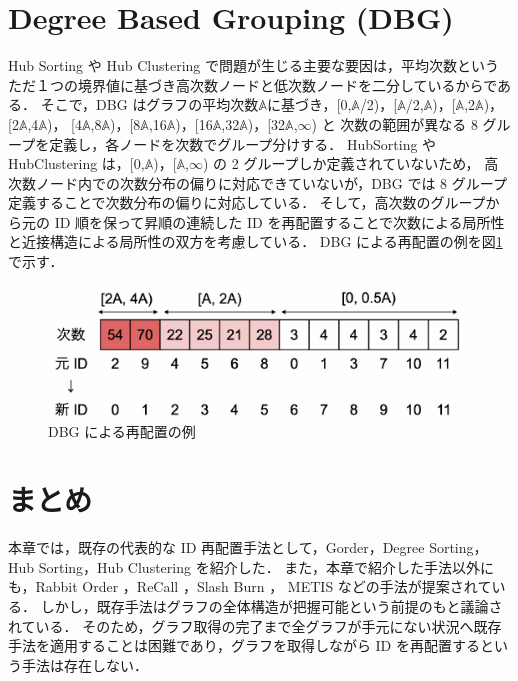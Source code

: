 \section{Degree Based Grouping (DBG)}
\label{dbg}
Hub Sorting や Hub Clustering で問題が生じる主要な要因は，平均次数というただ１つの境界値に基づき高次数ノードと低次数ノードを二分しているからである．
そこで，DBG \cite{faldu2019closer}はグラフの平均次数$\mathbb{A}$に基づき，[0,$\mathbb{A}$/2)，[$\mathbb{A}$/2,$\mathbb{A}$)，[$\mathbb{A}$,2$\mathbb{A}$)，[2$\mathbb{A}$,4$\mathbb{A}$)，
[4$\mathbb{A}$,8$\mathbb{A}$)，[8$\mathbb{A}$,16$\mathbb{A}$)，[16$\mathbb{A}$,32$\mathbb{A}$)，[32$\mathbb{A}$,$\infty$)
と 次数の範囲が異なる 8 グループを定義し，各ノードを次数でグループ分けする．
HubSorting や HubClustering は，[0,$\mathbb{A}$)，[$\mathbb{A}$,$\infty$) の 2 グループしか定義されていないため，
高次数ノード内での次数分布の偏りに対応できていないが，DBG では 8 グループ定義することで次数分布の偏りに対応している．
そして，高次数のグループから元の ID 順を保って昇順の連続した ID を再配置することで次数による局所性と近接構造による局所性の双方を考慮している．
DBG による再配置の例を図\ref{dbg} で示す．
\begin{figure}[t]
  \centering
  \includegraphics[width=\linewidth]{./figure/dbg.pdf}
  \caption{DBG による再配置の例}
  \label{sec:dbg}
\end{figure}
\section{まとめ}
本章では，既存の代表的な ID 再配置手法として，Gorder，Degree Sorting，Hub Sorting，Hub Clustering を紹介した．
また，本章で紹介した手法以外にも，Rabbit Order \cite{arai2016rabbit}，ReCall \cite{lakhotia2017recall}，Slash Burn \cite{kang2011beyond}，
METIS \cite{karypis1998multilevelk} などの手法が提案されている．
しかし，既存手法はグラフの全体構造が把握可能という前提のもと議論されている．
そのため，グラフ取得の完了まで全グラフが手元にない状況へ既存手法を適用することは困難であり，グラフを取得しながら ID を再配置するという手法は存在しない．